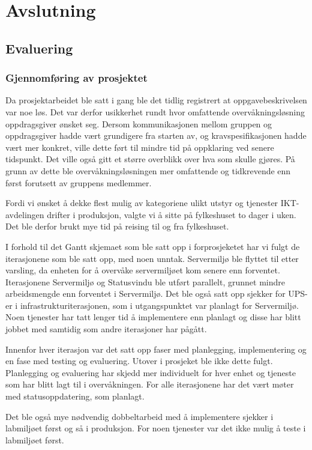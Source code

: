\chapter{Avslutning}
\section{Evaluering}
\subsection{Gjennomføring av prosjektet}
Da prosjektarbeidet ble satt i gang ble det tidlig registrert at oppgavebeskrivelsen var noe løs. Det var derfor usikkerhet rundt hvor omfattende overvåkningsløsning oppdragsgiver ønsket seg. Dersom kommunikasjonen mellom gruppen og oppdragsgiver hadde vært grundigere fra starten av, og kravspesifikasjonen hadde vært mer konkret, ville dette ført til mindre tid på oppklaring ved senere tidspunkt. Det ville også gitt et større overblikk over hva som skulle gjøres. På grunn av dette ble overvåkningsløsningen mer omfattende og tidkrevende enn først forutsett av gruppens medlemmer.

Fordi vi ønsket å dekke flest mulig av kategoriene ulikt utstyr og tjenester IKT-avdelingen drifter i produksjon, valgte vi å sitte på fylkeshuset to dager i uken. Det ble derfor brukt mye tid på reising til og fra fylkeshuset.

I forhold til det Gantt skjemaet som ble satt opp i forprosjeketet har vi fulgt de iterasjonene som ble satt opp, med noen unntak. Servermiljø ble flyttet til etter varsling, da enheten for å overvåke servermiljøet kom senere enn forventet. Iterasjonene Servermiljø og Statusvindu ble utført parallelt, grunnet mindre arbeidsmengde enn forventet i Servermiljø. Det ble også satt opp sjekker for UPS-er i infrastrukturiterasjonen, som i utgangspunktet var planlagt for Servermiljø. Noen tjenester har tatt lenger tid å implementere enn planlagt og disse har blitt jobbet med samtidig som andre iterasjoner har pågått.

Innenfor hver iterasjon var det satt opp faser med planlegging, implementering og en fase med testing og evaluering. Utover i prosjeket ble ikke dette fulgt. Planlegging og evaluering har skjedd mer individuelt for hver enhet og tjeneste som har blitt lagt til i overvåkningen. For alle iterasjonene har det vært møter med statusoppdatering, som planlagt. 

Det ble også mye nødvendig dobbeltarbeid med å implementere sjekker i labmiljøet først og så i produksjon. For noen tjenester var det ikke mulig å teste i labmiljøet først.

